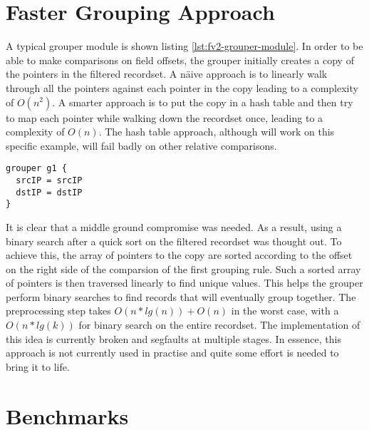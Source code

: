 \section{Faster Grouping Approach}\label{sec:faster-grouper}
A typical grouper module is shown listing \ref{lst:fv2-grouper-module}. In
order to be able to make comparisons on field offsets, the grouper initially
creates a copy of the pointers in the filtered recordset. A n\"aive approach
is to linearly walk through  all the
pointers against each pointer in the copy leading to a complexity of $O(n^2)$.
A smarter approach is to put the copy in a hash table and then try to map each
pointer while walking down the recordset once, leading to a complexity of
$O(n)$. The hash table approach, although will work on this specific example,
will fail badly on other relative comparisons.

\begin{lstlisting}
grouper g1 {
  srcIP = srcIP
  dstIP = dstIP
}
\end{lstlisting}

It is clear that a middle ground compromise was needed. As a result, using a
binary search after a quick sort on the filtered recordset was thought out. To
achieve this, the array of pointers to the copy are sorted according to the
offset on the right side of the comparsion of the first grouping rule.
 Such a sorted array of pointers
is then traversed linearly to find unique values. This helps the grouper
perform binary searches to find records that will eventually group together.
The preprocessing step takes $O(n*lg(n)) + O(n)$ in the worst case, with a
$O(n*lg(k))$ for binary search on the entire recordset. The implementation of
this idea is currently broken and segfaults at multiple stages. In essence,
this approach is not currently used in practise and quite some effort is
needed to bring it to life.


\section{Benchmarks}\label{sec:benchmarks}

